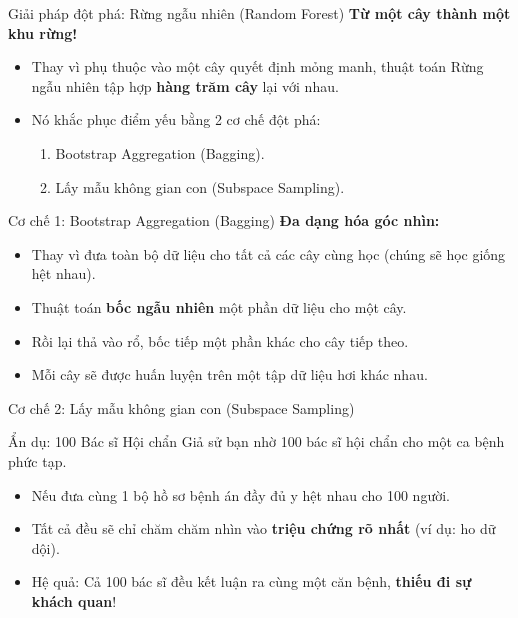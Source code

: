 \documentclass[aspectratio=169]{beamer}
\begin{document}
\begin{frame}{Giải pháp đột phá: Rừng ngẫu nhiên (Random Forest)}
    \textbf{Từ một cây thành một khu rừng!}
    \begin{itemize}
        \item Thay vì phụ thuộc vào một cây quyết định mỏng manh, thuật toán Rừng ngẫu nhiên tập hợp \textbf{hàng trăm cây} lại với nhau.
        \item Nó khắc phục điểm yếu bằng 2 cơ chế đột phá:
        \begin{enumerate}
            \item Bootstrap Aggregation (Bagging).
            \item Lấy mẫu không gian con (Subspace Sampling).
        \end{enumerate}
    \end{itemize}
\end{frame}

\begin{frame}{Cơ chế 1: Bootstrap Aggregation (Bagging)}
    \textbf{Đa dạng hóa góc nhìn:}
    \begin{itemize}
        \item Thay vì đưa toàn bộ dữ liệu cho tất cả các cây cùng học (chúng sẽ học giống hệt nhau).
        \item Thuật toán \textbf{bốc ngẫu nhiên} một phần dữ liệu cho một cây.
        \item Rồi lại thả vào rổ, bốc tiếp một phần khác cho cây tiếp theo.
        \item Mỗi cây sẽ được huấn luyện trên một tập dữ liệu hơi khác nhau.
    \end{itemize}
\end{frame}

\begin{frame}{Cơ chế 2: Lấy mẫu không gian con (Subspace Sampling)}
    \begin{exampleblock}{Ẩn dụ: 100 Bác sĩ Hội chẩn}
        Giả sử bạn nhờ 100 bác sĩ hội chẩn cho một ca bệnh phức tạp.
        \begin{itemize}
            \item Nếu đưa cùng 1 bộ hồ sơ bệnh án đầy đủ y hệt nhau cho 100 người.
            \item Tất cả đều sẽ chỉ chăm chăm nhìn vào \textbf{triệu chứng rõ nhất} (ví dụ: ho dữ dội).
            \item Hệ quả: Cả 100 bác sĩ đều kết luận ra cùng một căn bệnh, \textbf{thiếu đi sự khách quan}!
        \end{itemize}
    \end{exampleblock}
\end{frame}
\end{document}
